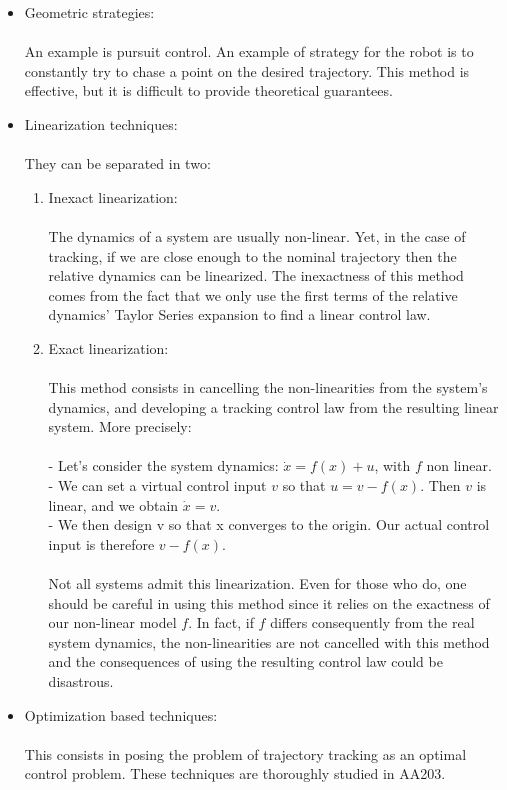 \documentclass[twoside]{article}
\begin{document}
\begin{itemize}
  \item Geometric strategies: \\
  \\ An example is pursuit control. An example of strategy for the robot is to constantly try to chase a point on the desired trajectory. This method is effective, but it is difficult to provide theoretical guarantees.
  \item Linearization techniques: \\
  \\ They can be separated in two:
  \begin{enumerate}
    \item Inexact linearization: \\
    \\
    The dynamics of a system are usually non-linear. Yet, in the case of tracking, if we are close enough to the nominal trajectory then the relative dynamics can be linearized. The inexactness of this method comes from the fact that we only use the first terms of the relative dynamics' Taylor Series expansion to find a linear control law.
    \\
    \item Exact linearization: \\
    \\
    This method consists in cancelling the non-linearities from the system's dynamics, and developing a tracking control law from the resulting linear system. More precisely: \\
    \\
    - Let's consider the system dynamics: $\dot{x} = f(x) + u$, with $f$ non linear.\\
     - We can set a virtual control input $v$ so that $u = v - f(x)$. Then $v$ is linear, and we obtain $\dot{x} = v$. \\
     - We then design v so that x converges to the origin. Our actual control input is therefore $v - f(x)$. \\
     \\
     Not all systems admit this linearization. Even for those who do, one should be careful in using this method since it relies on the exactness of our non-linear model $f$. In fact, if $f$ differs consequently from the real system dynamics, the non-linearities are not cancelled with this method and the consequences of using the resulting control law could be disastrous.
  \end{enumerate}
  \item Optimization based techniques: \\
  \\
  This consists in posing the problem of trajectory tracking as an optimal control problem. These techniques are thoroughly studied in AA203.
\end{itemize}
\end{document}
